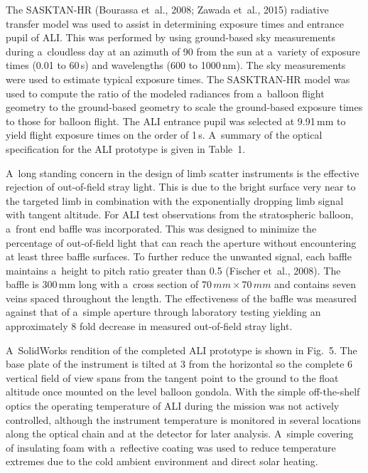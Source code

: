 \documentclass[amtd, online, hvmath]{copernicus}
\begin{document}
The SASKTAN-HR (Bourassa et~al., 2008; Zawada et~al., 2015) radiative
transfer model was used to assist in determining exposure times and
entrance pupil of ALI. This was performed by using ground-based sky
measurements during a~cloudless day at an azimuth of 90{\degree} from
the sun at a~variety of exposure times (0.01 to 60\,s) and wavelengths
(600 to 1000\,\unit{nm}). The sky measurements were used to estimate
typical exposure times. The SASKTRAN-HR model was used to compute the
ratio of the modeled radiances from a~balloon flight geometry to the
ground-based geometry to scale the ground-based exposure times to
those for balloon flight. The ALI entrance pupil was selected at
9.91\,\unit{mm} to yield flight exposure times on the order of
1\,s. A~summary of the optical specification for the ALI prototype is
given in Table~1.

A~long standing concern in the design of limb scatter instruments is
the effective rejection of out-of-field stray light. This is due to
the bright surface very near to the targeted limb in combination with
the exponentially dropping limb signal with tangent altitude. For ALI
test observations from the stratospheric balloon, a~front end baffle
was incorporated. This was designed to minimize the percentage of
out-of-field light that can reach the aperture without encountering at
least three baffle surfaces. To further reduce the unwanted signal,
each baffle maintains a~height to pitch ratio greater than 0.5
(Fischer et~al., 2008). The baffle is 300\,\unit{mm} long with a~cross
section of $70\,\unit{mm} \times 70\,\unit{mm}$ and contains seven
veins spaced throughout the length. The effectiveness of the baffle
was measured against that of a~simple aperture through laboratory
testing yielding an approximately 8 fold decrease in measured
out-of-field stray light.

A~SolidWorks rendition of the completed ALI prototype is shown in
Fig.~5.  The base plate of the instrument is tilted at 3{\degree} from
the horizontal so the complete 6{\degree} vertical field of view spans
from the tangent point to the ground to the float altitude once
mounted on the level balloon gondola.  With the simple off-the-shelf
optics the operating temperature of ALI during the mission was not
actively controlled, although the instrument temperature is monitored
in several locations along the optical chain and at the detector for
later analysis. A~simple covering of insulating foam with a~reflective
coating was used to reduce temperature extremes due to the cold
ambient environment and direct solar heating.
\end{document}
